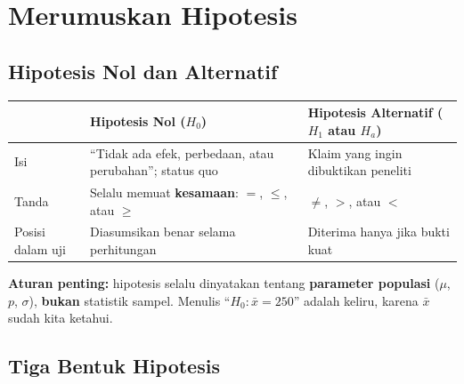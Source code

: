 \documentclass[
  indonesian,
  letterpaper,
]{book}
\newcounter{none} %
\begin{document}

\chapter{Merumuskan Hipotesis}\label{merumuskan-hipotesis}

\section{Hipotesis Nol dan
Alternatif}\label{hipotesis-nol-dan-alternatif}

{\def\LTcaptype{none} %
\begin{longtable}[]{@{}
  >{\raggedright\arraybackslash}p{}
  >{\raggedright\arraybackslash}p{}
  >{\raggedright\arraybackslash}p{}@{}}
\toprule\noalign{}
\begin{minipage}[b]{\linewidth}\raggedright
\end{minipage} & \begin{minipage}[b]{\linewidth}\raggedright
Hipotesis Nol (\(H_0\))
\end{minipage} & \begin{minipage}[b]{\linewidth}\raggedright
Hipotesis Alternatif (\(H_1\) atau \(H_a\))
\end{minipage} \\
\midrule\noalign{}
\endhead
\bottomrule\noalign{}
\endlastfoot
Isi & ``Tidak ada efek, perbedaan, atau perubahan''; status quo & Klaim
yang ingin dibuktikan peneliti \\
Tanda & Selalu memuat \textbf{kesamaan}: \(=\), \(\le\), atau \(\ge\) &
\(\ne\), \(>\), atau \(<\) \\
Posisi dalam uji & Diasumsikan benar selama perhitungan & Diterima hanya
jika bukti kuat \\
\end{longtable}
}

\textbf{Aturan penting:} hipotesis selalu dinyatakan tentang
\textbf{parameter populasi} (\(\mu\), \(p\), \(\sigma\)), \textbf{bukan}
statistik sampel. Menulis ``\(H_0: \bar{x} = 250\)'' adalah keliru,
karena \(\bar{x}\) sudah kita ketahui.

\section{Tiga Bentuk Hipotesis}\label{tiga-bentuk-hipotesis}
\end{document}
